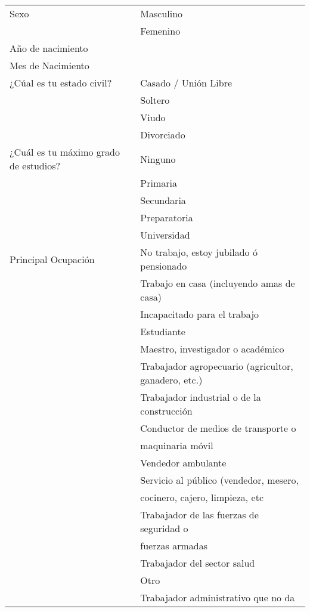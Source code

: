 \documentclass[letterpaper]{article}
\begin{document}
%
% 
% 

%
%
 \begin{longtable}{|l|l|} 
 \hline \endhead \hline \endfoot \hline 
Sexo & Masculino \\ 
 & Femenino \\ \hline 
Año de nacimiento &  \\ \hline 
Mes de Nacimiento &  \\ \hline 
¿Cúal es tu estado civil? & Casado / Unión Libre \\ 
 & Soltero \\ 
 & Viudo \\ 
 & Divorciado \\ \hline 
¿Cuál es tu máximo grado de estudios? & Ninguno \\  
 & Primaria \\  
 & Secundaria \\  
 & Preparatoria \\  
 & Universidad \\ \hline 
Principal Ocupación & No trabajo, estoy jubilado ó pensionado \\ 
 & Trabajo en casa (incluyendo amas de casa) \\ 
 & Incapacitado para el trabajo \\ 
 & Estudiante \\ 
 & Maestro, investigador o académico \\ 
 & Trabajador agropecuario (agricultor, ganadero, etc.) \\ 
 & Trabajador industrial o de la construcción \\ 
 & Conductor de medios de transporte o \\ 
 & maquinaria móvil \\
 & Vendedor ambulante \\ 
 & Servicio al público (vendedor, mesero,  \\ 
 & cocinero, cajero, limpieza, etc \\
 & Trabajador de las fuerzas de seguridad o  \\ 
 & fuerzas armadas \\
 & Trabajador del sector salud \\ 
 & Otro \\ 
 & Trabajador administrativo que no da \\

\end{longtable}
\end{document}
